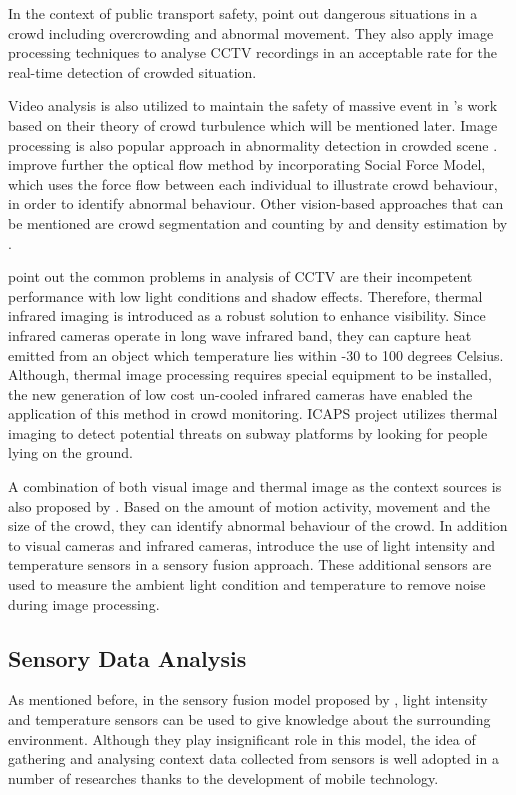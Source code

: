 In the context of public transport safety, \citet{Velastin1999} point out dangerous situations in a crowd including overcrowding and abnormal movement. They also apply image processing techniques to analyse CCTV recordings in an acceptable rate for the real-time detection of crowded situation.

Video analysis is also utilized to maintain the safety of massive event in \citet{Johansson2008}’s work based on their theory of crowd turbulence which will be mentioned later. Image processing is also popular approach in abnormality detection in crowded scene \citep{Mahadevan2010, Mehran2009}. \citet{Mehran2009} improve further the optical flow method by incorporating Social Force Model, which uses the force flow between each individual to illustrate crowd behaviour, in order to identify abnormal behaviour. Other vision-based approaches that can be mentioned are crowd segmentation and counting by \citet{Chan2008} and density estimation by \citet{Li2010}.

\citet{Andersson2009} point out the common problems in analysis of CCTV are their incompetent performance with low light conditions and shadow effects. Therefore, thermal infrared imaging is introduced as a robust solution to enhance visibility. Since infrared cameras operate in long wave infrared band, they can capture heat emitted from an object which temperature lies within -30 to 100 degrees Celsius. Although, thermal image processing requires special equipment to be installed, the new generation of low cost un-cooled infrared cameras have enabled the application of this method in crowd monitoring. ICAPS project \citep{Pham2007} utilizes thermal imaging to detect potential threats on subway platforms by looking for people lying on the ground.

A combination of both visual image and thermal image as the context sources is also proposed by \citet{Andersson2009}. Based on the amount of motion activity, movement and the size of the crowd, they can identify abnormal behaviour of the crowd. In addition to visual cameras and infrared cameras, \citet{Yaseen2013} introduce the use of light intensity and temperature sensors in a sensory fusion approach. These additional sensors are used to measure the ambient light condition and temperature to remove noise during image processing.

\subsection{Sensory Data Analysis}
As mentioned before, in the sensory fusion model proposed by \citet{Yaseen2013}, light intensity and temperature sensors can be used to give knowledge about the surrounding environment. Although they play insignificant role in this model, the idea of gathering and analysing context data collected from sensors is well adopted in a number of researches thanks to the development of mobile technology.

